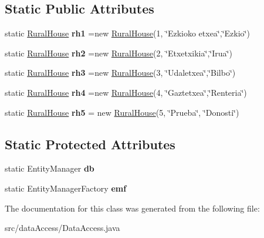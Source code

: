 \subsection*{Static Public Attributes}
\begin{DoxyCompactItemize}
\item 
\mbox{\label{classdata_access_1_1_data_access_aa1663c162b42afb414590e1a5c9ef9bc}} 
static \mbox{\hyperlink{classdomain_1_1_rural_house}{Rural\+House}} {\bfseries rh1} =new \mbox{\hyperlink{classdomain_1_1_rural_house}{Rural\+House}}(1, \char`\"{}Ezkioko etxea\char`\"{},\char`\"{}Ezkio\char`\"{})
\item 
\mbox{\label{classdata_access_1_1_data_access_a66369c2b00261f37b82a09dfa627a908}} 
static \mbox{\hyperlink{classdomain_1_1_rural_house}{Rural\+House}} {\bfseries rh2} =new \mbox{\hyperlink{classdomain_1_1_rural_house}{Rural\+House}}(2, \char`\"{}Etxetxikia\char`\"{},\char`\"{}Iru{\ucr}a\char`\"{})
\item 
\mbox{\label{classdata_access_1_1_data_access_a8744023ed07b9b274bb555eb78d176fb}} 
static \mbox{\hyperlink{classdomain_1_1_rural_house}{Rural\+House}} {\bfseries rh3} =new \mbox{\hyperlink{classdomain_1_1_rural_house}{Rural\+House}}(3, \char`\"{}Udaletxea\char`\"{},\char`\"{}Bilbo\char`\"{})
\item 
\mbox{\label{classdata_access_1_1_data_access_ae610cd3135e02e7e22239ff243c07a1b}} 
static \mbox{\hyperlink{classdomain_1_1_rural_house}{Rural\+House}} {\bfseries rh4} =new \mbox{\hyperlink{classdomain_1_1_rural_house}{Rural\+House}}(4, \char`\"{}Gaztetxea\char`\"{},\char`\"{}Renteria\char`\"{})
\item 
\mbox{\label{classdata_access_1_1_data_access_a0359904deb5a93ce8049a3ce3343c541}} 
static \mbox{\hyperlink{classdomain_1_1_rural_house}{Rural\+House}} {\bfseries rh5} = new \mbox{\hyperlink{classdomain_1_1_rural_house}{Rural\+House}}(5, \char`\"{}Prueba\char`\"{}, \char`\"{}Donosti\char`\"{})
\end{DoxyCompactItemize}
\subsection*{Static Protected Attributes}
\begin{DoxyCompactItemize}
\item 
\mbox{\label{classdata_access_1_1_data_access_a0920d5a9c61bdae39ef950d6e4e187e4}} 
static Entity\+Manager {\bfseries db}
\item 
\mbox{\label{classdata_access_1_1_data_access_a158d2718ef5a80f4f296b14937cc1775}} 
static Entity\+Manager\+Factory {\bfseries emf}
\end{DoxyCompactItemize}


The documentation for this class was generated from the following file\+:\begin{DoxyCompactItemize}
\item 
src/data\+Access/Data\+Access.\+java\end{DoxyCompactItemize}
